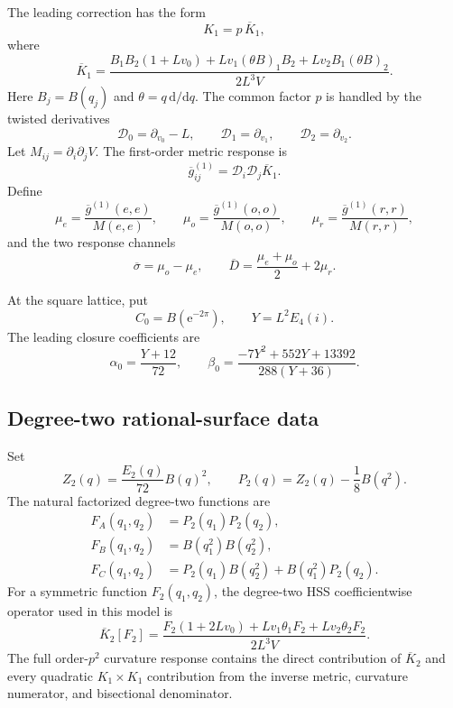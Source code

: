 \documentclass[11pt]{article}
\theoremstyle{definition}
\theoremstyle{remark}
\newcommand{\dd}{\mathrm{d}}
\newcommand{\e}{\mathrm{e}}
\newcommand{\bK}{\overline{K}}
\newcommand{\bg}{\overline{g}}
\newcommand{\bsigma}{\overline{\sigma}}
\newcommand{\bD}{\overline{D}}
\begin{document}
The leading correction has the form
\begin{equation}\label{eq:K1}
 K_1=p\,\bK_1,
\end{equation}
where
\begin{equation}\label{eq:K1bar}
 \bK_1=
 \frac{B_1B_2(1+Lv_0)+Lv_1(\theta B)_1B_2+Lv_2B_1(\theta B)_2}
 {2L^3V}.
\end{equation}
Here $B_j=B(q_j)$ and $\theta=q\,\dd/\dd q$.  The common factor $p$ is handled by the twisted derivatives
\begin{equation}\label{eq:twisted}
 \mathscr D_0=\partial_{v_0}-L,
 \qquad
 \mathscr D_1=\partial_{v_1},
 \qquad
 \mathscr D_2=\partial_{v_2}.
\end{equation}
Let $M_{ij}=\partial_i\partial_jV$.  The first-order metric response is
\[
 \bg^{(1)}_{ij}=\mathscr D_i\mathscr D_j\bK_1.
\]
Define
\begin{equation}\label{eq:mu}
 \mu_e=\frac{\bg^{(1)}(e,e)}{M(e,e)},
 \qquad
 \mu_o=\frac{\bg^{(1)}(o,o)}{M(o,o)},
 \qquad
 \mu_r=\frac{\bg^{(1)}(r,r)}{M(r,r)},
\end{equation}
and the two response channels
\begin{equation}\label{eq:channels}
 \bsigma=\mu_o-\mu_e,
 \qquad
 \bD=\frac{\mu_e+\mu_o}{2}+2\mu_r.
\end{equation}

At the square lattice, put
\begin{equation}\label{eq:C0Y}
 C_0=B(\e^{-2\pi}),
 \qquad
 Y=L^2E_4(i).
\end{equation}
The leading closure coefficients are
\begin{equation}\label{eq:alpha0beta0}
 \alpha_0=\frac{Y+12}{72},
 \qquad
 \beta_0=\frac{-7Y^2+552Y+13392}{288(Y+36)}.
\end{equation}

\subsection{Degree-two rational-surface data}

Set
\begin{equation}\label{eq:Z2P2}
 Z_2(q)=\frac{E_2(q)}{72}B(q)^2,
 \qquad
 P_2(q)=Z_2(q)-\frac18B(q^2).
\end{equation}
The natural factorized degree-two functions are
\begin{align}
 F_A(q_1,q_2)&=P_2(q_1)P_2(q_2),\label{eq:FA}\\
 F_B(q_1,q_2)&=B(q_1^2)B(q_2^2),\label{eq:FB}\\
 F_C(q_1,q_2)&=P_2(q_1)B(q_2^2)+B(q_1^2)P_2(q_2).\label{eq:FC}
\end{align}
For a symmetric function $F_2(q_1,q_2)$, the degree-two HSS coefficientwise operator used in this model is
\begin{equation}\label{eq:K2operator}
 \bK_2[F_2]
 =\frac{F_2(1+2Lv_0)+Lv_1\theta_1F_2+Lv_2\theta_2F_2}{2L^3V}.
\end{equation}
The full order-$p^2$ curvature response contains the direct contribution of $\bK_2$ and every quadratic $K_1\times K_1$ contribution from the inverse metric, curvature numerator, and bisectional denominator.
\end{document}
